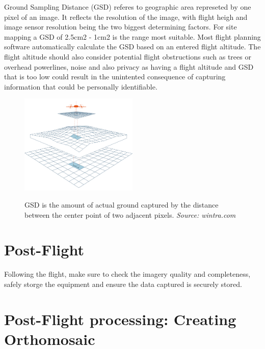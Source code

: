 \documentclass[
  a4paper,
  onecolumn,
  oneside]{book}
\begin{document}
Ground Sampling Distance (GSD) referes to geographic area represeted by
one pixel of an image. It reflects the resolution of the image, with
flight heigh and image sensor resolution being the two biggest
determining factors. For site mapping a GSD of 2.5cm2 - 1cm2 is the
range most suitable. Most flight planning software automatically
calculate the GSD based on an entered flight altitude. The flight
altitude should also consider potential flight obstructions such as
trees or overhead powerlines, noise and also privacy as having a flight
altitude and GSD that is too low could result in the unintented
consequence of capturing information that could be personally
identifiable.

\begin{figure}

{\centering 

\href{/part2/images/gsd.png}{\includegraphics[width=0.5\textwidth,height=\textheight]{part2/images/gsd.png}}

}

\caption{GSD is the amount of actual ground captured by the distance
between the center point of two adjacent pixels. \emph{Source:
wintra.com}}

\end{figure}

\hypertarget{post-flight}{%
\section{Post-Flight}\label{post-flight}}

Following the flight, make sure to check the imagery quality and
completeness, safely storge the equipment and ensure the data captured
is securely stored.

\hypertarget{post-flight-processing-creating-orthomosaic}{%
\section{Post-Flight processing: Creating
Orthomosaic}\label{post-flight-processing-creating-orthomosaic}}
\end{document}
